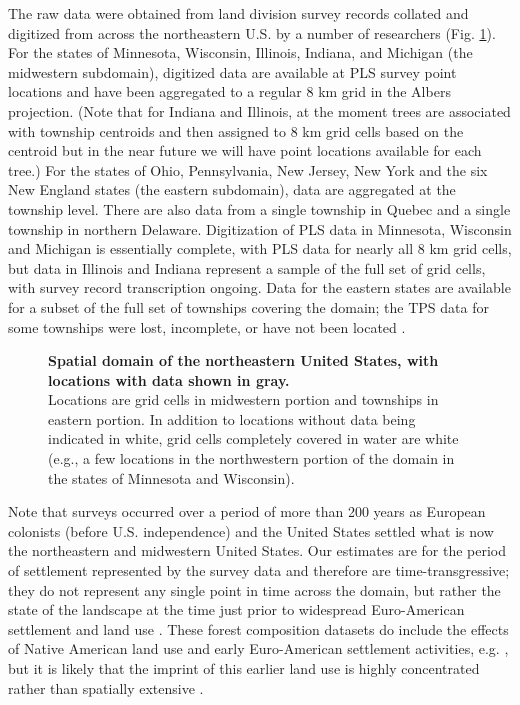 \documentclass[10pt,letterpaper]{article}
\begin{document}
The raw data were obtained from land division survey records collated
and digitized from across the northeastern U.S. by a number of researchers
(Fig. \ref{fig:Spatial-domain}). For the states of Minnesota, Wisconsin,
Illinois, Indiana, and Michigan (the midwestern subdomain), digitized
data are available at PLS survey point locations and have been aggregated
to a regular 8 km grid in the Albers projection. (Note that for Indiana
and Illinois, at the moment trees are associated with township centroids
and then assigned to 8 km grid cells based on the centroid but in
the near future we will have point locations available for each tree.)
For the states of Ohio, Pennsylvania, New Jersey, New York and the
six New England states (the eastern subdomain), data are aggregated
at the township level. There are also data from a single township
in Quebec and a single township in northern Delaware. Digitization
of PLS data in Minnesota, Wisconsin and Michigan is essentially complete,
with PLS data for nearly all 8 km grid cells, but data in Illinois
and Indiana represent a sample of the full set of grid cells, with
survey record transcription ongoing. Data for the eastern states are
available for a subset of the full set of townships covering the domain;
the TPS data for some townships were lost, incomplete, or have not
been located \cite{Cogb:etal:2002}. 

\begin{figure}

\caption{{\bf Spatial domain of the northeastern United States, with locations with
data shown in gray.} \\ Locations are grid cells in midwestern portion
and townships in eastern portion. In addition to locations without
data being indicated in white, grid cells completely covered in water
are white (e.g., a few locations in the northwestern portion of the
domain in the states of Minnesota and Wisconsin).}
\label{fig:Spatial-domain}
\end{figure}


Note that surveys occurred over a period of more than 200 years as
European colonists (before U.S. independence) and the United States
settled what is now the northeastern and midwestern United States.
Our estimates are for the period of settlement represented by the
survey data and therefore are time-transgressive; they do not represent
any single point in time across the domain, but rather the state of
the landscape at the time just prior to widespread Euro-American settlement
and land use \cite{Whit:1996,Cogb:etal:2002}. These forest composition
datasets do include the effects of Native American land use and early
Euro-American settlement activities, e.g. \cite{Blac:etal:2006},
but it is likely that the imprint of this earlier land use is highly
concentrated rather than spatially extensive \cite{munoz2014defining}.
\end{document}
